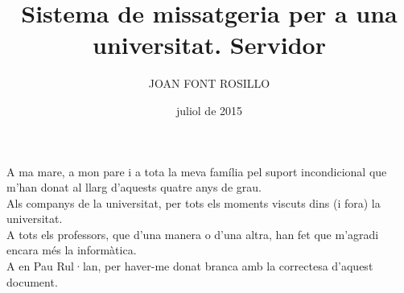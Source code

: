 \documentclass[catalan,GINF]{TFGEPSUIB}
\title{Sistema de missatgeria per a una universitat. Servidor}
\author{\MakeUppercase{Joan Font Rosillo}}
\date{juliol de 2015}
\begin{document}
\portada
\frontmatter

\cleartorecto \thispagestyle{empty}
\begin{agraiments}
A ma mare, a mon pare i a tota la meva família pel suport incondicional que m'han donat al llarg d'aquests quatre anys de grau.\\

Als companys de la universitat, per tots els moments viscuts dins (i fora) la universitat.\\

A tots els professors, que d'una manera o d'una altra, han fet que m'agradi encara més la informàtica.\\

A en Pau Rul·lan, per haver-me donat branca amb la correctesa d'aquest document.\\
\end{agraiments}

\cleartorecto \tableofcontents
\cleartorecto \listoffigures
\cleartorecto \listoftables 

 

 
\mainmatter\pagestyle{ruled}







\appendix 




\backmatter




\end{document}
